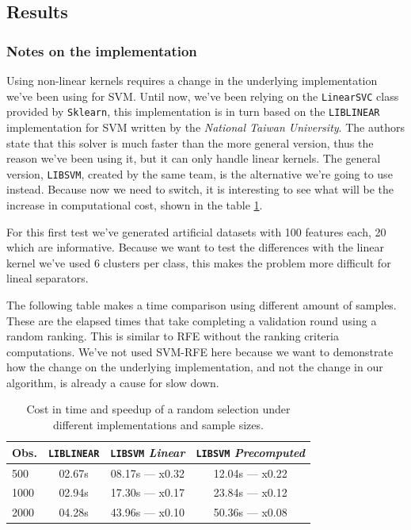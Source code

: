 \subsection{Results}

\subsubsection*{Notes on the implementation}

Using non-linear kernels requires a change in the underlying implementation we've been using for SVM. Until now, we've been relying on the \texttt{LinearSVC} class pro\-vid\-ed by \texttt{Sklearn}, this implementation is in turn based on the \texttt{LIBLINEAR} im\-ple\-men\-ta\-tion for SVM written by the \emph{National Taiwan University}. The authors state that this solver is much faster than the more general version, thus the reason we've been using it, but it can only handle linear kernels. The general version, \texttt{LIBSVM}, created by the same team, is the alternative we're going to use instead. Because now we need to switch, it is interesting to see what will be the increase in computational cost, shown in the table \ref{ch5.kernels.tc1}.

For this first test we've generated artificial datasets with 100 features each, 20 which are informative. Because we want to test the differences with the linear kernel we've used 6 clusters per class, this makes the problem more difficult for lineal separators. 

The following table makes a time comparison using different amount of samples. These are the elapsed times that take completing a validation round using a random ranking. This is similar to RFE without the ranking criteria computations. We've not used SVM-RFE here because we want to demonstrate how the change on the underlying implementation, and not the change in our algorithm, is already a cause for slow down.

\begin{table}[h]
    \centering
    \begin{tabular}{l c c c}
        \toprule
        Obs. & \texttt{LIBLINEAR} & \texttt{LIBSVM} \emph{Linear} & \texttt{LIBSVM} \emph{Precomputed} \\
        \midrule
        500 & 02.67s & 08.17s — x0.32 & 12.04s — x0.22 \\
        1000 & 02.94s & 17.30s — x0.17 & 23.84s — x0.12 \\
        2000 & 04.28s & 43.96s — x0.10 & 50.36s — x0.08 \\
        \bottomrule
        \end{tabular}
    \caption{Cost in time and speedup of a random selection under different implementations and sample sizes.}
    \label{ch5.kernels.tc1}
\end{table}

